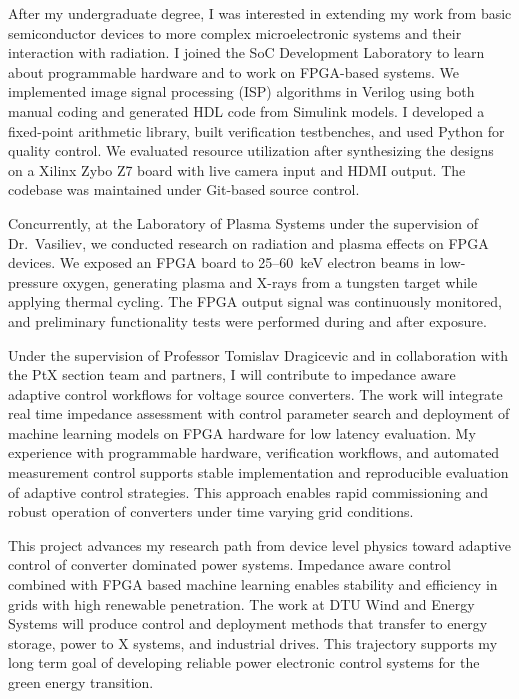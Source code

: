 \documentclass[a4paper,12pt]{article}
\begin{document}
After my undergraduate degree, I was interested in extending my work from basic semiconductor devices to more complex microelectronic systems and their interaction with radiation. I joined the SoC Development Laboratory to learn about programmable hardware and to work on FPGA-based systems. We implemented image signal processing (ISP) algorithms in Verilog using both manual coding and generated HDL code from Simulink models. I developed a fixed-point arithmetic library, built verification testbenches, and used Python for quality control. We evaluated resource utilization after synthesizing the designs on a Xilinx Zybo Z7 board with live camera input and HDMI output. The codebase was maintained under Git-based source control. 

Concurrently, at the Laboratory of Plasma Systems under the supervision of Dr.\ Vasiliev, we conducted research on radiation and plasma effects on FPGA devices. We exposed an FPGA board to 25--60~keV electron beams in low-pressure oxygen, generating plasma and X-rays from a tungsten target while applying thermal cycling. The FPGA output signal was continuously monitored, and preliminary functionality tests were performed during and after exposure.

Under the supervision of Professor Tomislav Dragicevic and in collaboration with the PtX section team and partners, I will contribute to impedance aware adaptive control workflows for voltage source converters. The work will integrate real time impedance assessment with control parameter search and deployment of machine learning models on FPGA hardware for low latency evaluation. My experience with programmable hardware, verification workflows, and automated measurement control supports stable implementation and reproducible evaluation of adaptive control strategies. This approach enables rapid commissioning and robust operation of converters under time varying grid conditions.

This project advances my research path from device level physics toward adaptive control of converter dominated power systems. Impedance aware control combined with FPGA based machine learning enables stability and efficiency in grids with high renewable penetration. The work at DTU Wind and Energy Systems will produce control and deployment methods that transfer to energy storage, power to X systems, and industrial drives. This trajectory supports my long term goal of developing reliable power electronic control systems for the green energy transition.
\end{document}
